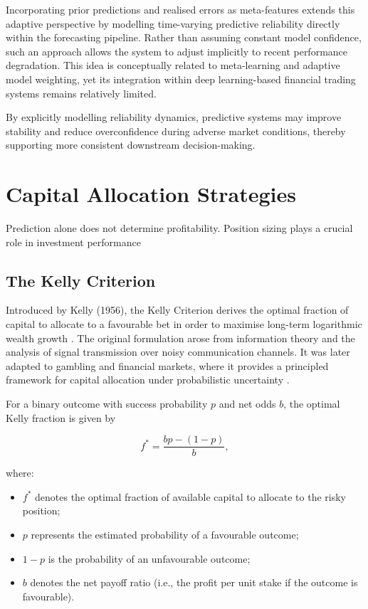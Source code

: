 \documentclass{l4proj}
\begin{document}
Incorporating prior predictions and realised errors as meta-features extends this adaptive perspective by modelling time-varying predictive reliability directly within the forecasting pipeline. Rather than assuming constant model confidence, such an approach allows the system to adjust implicitly to recent performance degradation. This idea is conceptually related to meta-learning and adaptive model weighting, yet its integration within deep learning-based financial trading systems remains relatively limited.

By explicitly modelling reliability dynamics, predictive systems may improve stability and reduce overconfidence during adverse market conditions, thereby supporting more consistent downstream decision-making.

\section{Capital Allocation Strategies }

Prediction alone does not determine profitability. Position sizing plays a crucial role in investment performance

\subsection{The Kelly Criterion}

Introduced by Kelly (1956), the Kelly Criterion derives the optimal fraction of capital to allocate to a favourable bet in order to maximise long-term logarithmic wealth growth \citep{https://doi.org/10.1002/j.1538-7305.1956.tb03809.x}. The original formulation arose from information theory and the analysis of signal transmission over noisy communication channels. It was later adapted to gambling and financial markets, where it provides a principled framework for capital allocation under probabilistic uncertainty \citep{doi:10.1142/9789814293501_0005, thorp2008, maclean}.

For a binary outcome with success probability $p$ and net odds $b$, the optimal Kelly fraction is given by

\[
f^* = \frac{bp - (1 - p)}{b},
\]

where:

\begin{itemize}
    \item $f^*$ denotes the optimal fraction of available capital to allocate to the risky position;
    \item $p$ represents the estimated probability of a favourable outcome;
    \item $1 - p$ is the probability of an unfavourable outcome;
    \item $b$ denotes the net payoff ratio (i.e., the profit per unit stake if the outcome is favourable).
\end{itemize}
\end{document}
